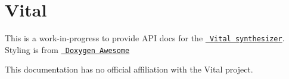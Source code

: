 \chapter{Vital}
\hypertarget{index}{}\label{index}
\label{index_md__2_users_2davidvogel_2repos_2_vital_help_2src_2_vital_doxygen_main_page}%
%


This is a work-\/in-\/progress to provide API docs for the \href{https://github.com/mtytel/vital/tree/main}{\texttt{ Vital synthesizer}}. Styling is from \href{https://jothepro.github.io/doxygen-awesome-css/index.html}{\texttt{ Doxygen Awesome}}

This documentation has no official affiliation with the Vital project. 